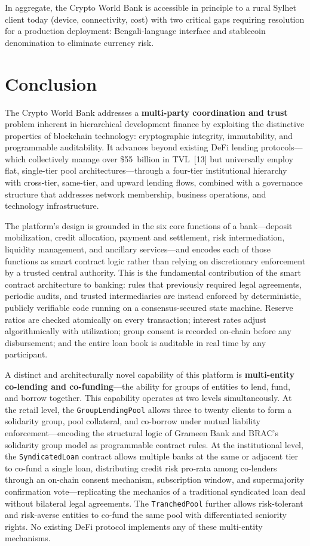 \documentclass[12pt,a4paper]{report}
\begin{document}
In aggregate, the Crypto World Bank is accessible in principle to a rural Sylhet client today (device, connectivity, cost) with two critical gaps requiring resolution for a production deployment: Bengali-language interface and stablecoin denomination to eliminate currency risk.


\chapter{Conclusion}

The Crypto World Bank addresses a \textbf{multi-party coordination and trust} problem inherent in hierarchical development finance by exploiting the distinctive properties of blockchain technology: cryptographic integrity, immutability, and programmable auditability. It advances beyond existing DeFi lending protocols---which collectively manage over \$55~billion in TVL~[13] but universally employ flat, single-tier pool architectures---through a four-tier institutional hierarchy with cross-tier, same-tier, and upward lending flows, combined with a governance structure that addresses network membership, business operations, and technology infrastructure.

The platform's design is grounded in the six core functions of a bank---deposit mobilization, credit allocation, payment and settlement, risk intermediation, liquidity management, and ancillary services---and encodes each of those functions as smart contract logic rather than relying on discretionary enforcement by a trusted central authority. This is the fundamental contribution of the smart contract architecture to banking: rules that previously required legal agreements, periodic audits, and trusted intermediaries are instead enforced by deterministic, publicly verifiable code running on a consensus-secured state machine. Reserve ratios are checked atomically on every transaction; interest rates adjust algorithmically with utilization; group consent is recorded on-chain before any disbursement; and the entire loan book is auditable in real time by any participant.

A distinct and architecturally novel capability of this platform is \textbf{multi-entity co-lending and co-funding}---the ability for groups of entities to lend, fund, and borrow together. This capability operates at two levels simultaneously. At the retail level, the \texttt{GroupLendingPool} allows three to twenty clients to form a solidarity group, pool collateral, and co-borrow under mutual liability enforcement---encoding the structural logic of Grameen Bank and BRAC's solidarity group model as programmable contract rules. At the institutional level, the \texttt{SyndicatedLoan} contract allows multiple banks at the same or adjacent tier to co-fund a single loan, distributing credit risk pro-rata among co-lenders through an on-chain consent mechanism, subscription window, and supermajority confirmation vote---replicating the mechanics of a traditional syndicated loan deal without bilateral legal agreements. The \texttt{TranchedPool} further allows risk-tolerant and risk-averse entities to co-fund the same pool with differentiated seniority rights. No existing DeFi protocol implements any of these multi-entity mechanisms.
\end{document}
